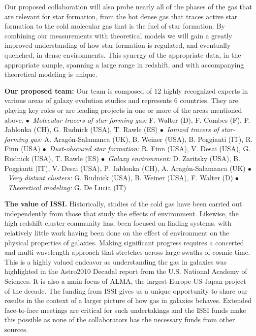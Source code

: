 \documentclass[11pt]{article}
\begin{document}
Our proposed collaboration will also probe nearly all of the phases of
the gas that are relevant for star formation, from the hot dense gas
that traces active star formation to the cold molecular gas that is
the fuel of star formation.  By combining our measurements with
theoretical models we will gain a greatly improved understanding of
how star formation is regulated, and eventually quenched, in dense
environments.  This synergy of the appropriate data, in the
appropriate sample, spanning a large range in redshift, and with
accompanying theoretical modeling is unique.

\textbf{Our proposed team:} Our team is composed of 12 highly
recognized experts in various areas of galaxy evolution studies and
represents 6 countries.  They are playing key roles or are leading
projects in one or more of the areas mentioned
above. $\bullet$~\textit{Molecular tracers of star-forming gas:}
F. Walter (D), F. Combes (F), P. Jablonka (CH), G. Rudnick (USA),
T. Rawle (ES) $\bullet$~\textit{Ionized tracers of star-forming gas:}
A. Arag\'{o}n-Salamanca (UK), B. Weiner (USA), B. Poggianti (IT),
R. Finn (USA) $\bullet$~\textit{Dust-obscured star formation:} R. Finn
(USA), V. Desai (USA), G. Rudnick (USA), T. Rawle (ES)
$\bullet$~\textit{Galaxy environment:} D. Zaritsky (USA), B. Poggianti
(IT), V. Desai (USA), P. Jablonka (CH), A. Arag\'{o}n-Salamanca (UK)
$\bullet$~\textit{Very distant clusters:} G. Rudnick (USA), B. Weiner
(USA), F. Walter (D) $\bullet$~\textit{Theoretical modeling:} G. De
Lucia (IT)

\textbf{The value of ISSI.}  Historically, studies of the cold gas
have been carried out independently from those that study the effects
of environment.  Likewise, the high redshift cluster community has,
been focused on finding systems, with relatively little work having
been done on the effect of environment on the physical properties of
galaxies.  Making significant progress requires a concerted and
multi-wavelength approach that stretches across large swaths of cosmic
time.  This is a highly valued endeavor as understanding the gas in
galaxies was highlighted in the Astro2010 Decadal report from the
U.S. National Academy of Sciences.  It is also a main focus of ALMA,
the largest Europe-US-Japan project of the decade. The funding from
ISSI gives us a unique opportunity to share our results in the context
of a larger picture of how gas in galaxies behaves.  Extended
face-to-face meetings are critical for such undertakings and the ISSI
funds make this possible as none of the collaborators has the
necessary funds from other sources.
\end{document}
